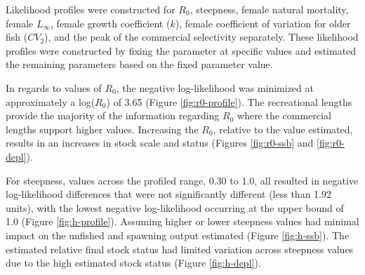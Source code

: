 \documentclass[11pt,
  english,
  a4paper,
]{article}
\begin{document}
\leavevmode\tagmcend\tagstructend


Likelihood profiles were constructed for {\(R_0\)\leavevmode\tagmcend\tagstructend}, steepness, female natural mortality, female {\(L_{\infty}\)\leavevmode\tagmcend\tagstructend}, female growth coefficient ({\(k\)\leavevmode\tagmcend\tagstructend}), female coefficient of variation for older fish ({\(CV_2\)\leavevmode\tagmcend\tagstructend}), and the peak of the commercial selectivity separately. These likelihood profiles were constructed by fixing the parameter at specific values and estimated the remaining parameters based on the fixed parameter value.

\leavevmode\tagmcend\tagstructend\par


In regards to values of {\(R_0\)\leavevmode\tagmcend\tagstructend}, the negative log-likelihood was minimized at approximately a log({\(R_0\)\leavevmode\tagmcend\tagstructend}) of 3.65 (Figure \ref{fig:r0-profile}). The recreational lengths provide the majority of the information regarding {\(R_0\)\leavevmode\tagmcend\tagstructend} where the commercial lengths support higher values. Increasing the {\(R_0\)\leavevmode\tagmcend\tagstructend}, relative to the value estimated, results in an increases in stock scale and status (Figures \ref{fig:r0-ssb} and \ref{fig:r0-depl}).

\leavevmode\tagmcend\tagstructend\par


For steepness, values across the profiled range, 0.30 to 1.0, all resulted in negative log-likelihood differences that were not significantly different (less than 1.92 units), with the lowest negative log-likelihood occurring at the upper bound of 1.0 (Figure \ref{fig:h-profile}). Assuming higher or lower steepness values had minimal impact on the unfished and spawning output estimated (Figure \ref{fig:h-ssb}). The estimated relative final stock status had limited variation across steepness values due to the high estimated stock status (Figure \ref{fig:h-depl}).
\end{document}
